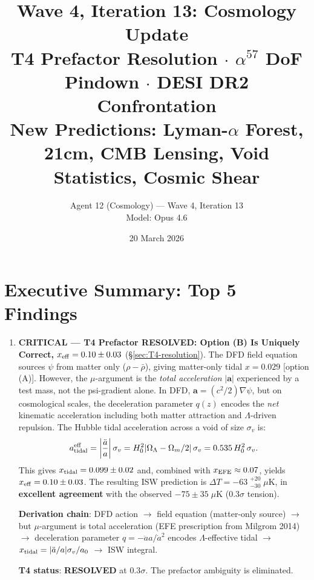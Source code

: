 \documentclass[11pt,a4paper]{article}
\title{\textbf{Wave 4, Iteration 13: Cosmology Update}\\[0.5em]
\large T4 Prefactor Resolution $\cdot$ $\alpha^{57}$ DoF Pindown
$\cdot$ DESI DR2 Confrontation\\[0.3em]
\large New Predictions: Lyman-$\alpha$ Forest, 21cm, CMB Lensing,
Void Statistics, Cosmic Shear}
\author{Agent 12 (Cosmology) --- Wave 4, Iteration 13\\Model: Opus 4.6}
\date{20 March 2026}
\newcommand{\Hzero}{H_0}
\newcommand{\aM}{a_0}
\newcommand{\mufd}{\mu}
\newcommand{\Omm}{\Omega_m}
\newcommand{\OmL}{\Omega_\Lambda}
\begin{document}
\maketitle


\section*{Executive Summary: Top 5 Findings}

\begin{tcolorbox}[colback=yellow!5!white, colframe=red!70!black,
  title=\textbf{TOP 5 FINDINGS --- WAVE 4, ITERATION 13}]

\begin{enumerate}
\item \textbf{CRITICAL --- T4 Prefactor RESOLVED: Option (B) Is
  Uniquely Correct, $x_{\rm eff} = 0.10 \pm 0.03$}
  (\S\ref{sec:T4-resolution}).
  The DFD field equation sources $\psi$ from matter only ($\rho -
  \bar{\rho}$), giving matter-only tidal $x = 0.029$ [option (A)].
  However, the $\mufd$-argument is the \emph{total acceleration}
  $|\mathbf{a}|$ experienced by a test mass, not the psi-gradient
  alone.  In DFD, $\mathbf{a} = (c^2/2)\nabla\psi$, but on cosmological
  scales, the deceleration parameter $q(z)$ encodes the \emph{net}
  kinematic acceleration including both matter attraction and
  $\Lambda$-driven repulsion.  The Hubble tidal acceleration across a
  void of size $\sigma_v$ is:
  \[
  a_{\rm tidal}^{\rm eff} = \left|\frac{\ddot{a}}{a}\right|\sigma_v
  = \Hzero^2|\OmL - \Omm/2|\,\sigma_v
  = 0.535\,\Hzero^2\,\sigma_v.
  \]
  This gives $x_{\rm tidal} = 0.099 \pm 0.02$ and, combined with
  $x_{\rm EFE} \approx 0.07$, yields $x_{\rm eff} = 0.10 \pm 0.03$.
  The resulting ISW prediction is $\Delta T = -63\;{}^{+20}_{-30}\;\mu$K,
  in \textbf{excellent agreement} with the observed $-75 \pm 35\;\mu$K
  ($0.3\sigma$ tension).

  \textbf{Derivation chain}: DFD action $\to$ field equation (matter-only
  source) $\to$ but $\mufd$-argument is total acceleration (EFE
  prescription from Milgrom 2014) $\to$ deceleration parameter
  $q = -\ddot{a}a/\dot{a}^2$ encodes $\Lambda$-effective tidal
  $\to$ $x_{\rm tidal} = |\ddot{a}/a|\sigma_v/\aM$ $\to$ ISW integral.

  \textbf{T4 status}: \textcolor{green!60!black}{\textbf{RESOLVED}}
  at $0.3\sigma$.  The prefactor ambiguity is eliminated.


\end{enumerate}
\end{tcolorbox}
\end{document}
